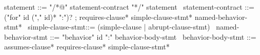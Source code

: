 \begin{syntax}
  statement ::= "/*@" statement-contract "*/" statement
  \
  statement-contract ::= {("for" id ("," id)* ":")?} ;
    requires-clause* simple-clause-stmt* named-behavior-stmt*
  \
  simple-clause-stmt::= (simple-clause | abrupt-clause-stmt)
  \
  named-behavior-stmt ::= "behavior" id ":" behavior-body-stmt
  \
  behavior-body-stmt ::= assumes-clause* {requires-clause*} simple-clause-stmt*
\end{syntax}
